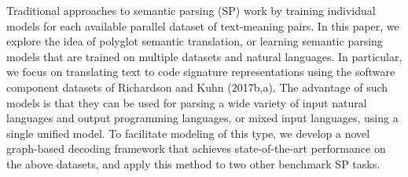 Traditional approaches to semantic parsing (SP) work by training individual models for each available parallel dataset of text-meaning pairs. In this paper, we explore the idea of polyglot semantic translation, or learning semantic parsing models that are trained on multiple datasets and natural languages.  In particular, we focus on translating text to code signature representations using the software component datasets of Richardson and Kuhn (2017b,a). The advantage of such models is that they can be used for parsing  a wide variety of input natural languages and output programming languages, or mixed input languages, using a single unified model. To facilitate modeling of this type, we develop a novel graph-based decoding framework that achieves state-of-the-art performance on the above datasets, and apply this method to two other benchmark SP tasks.
